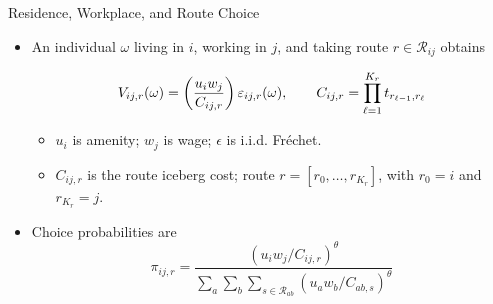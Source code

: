 \documentclass[11pt,aspectratio=169]{beamer}
\newcommand{\R}{\mathcal{R}}
\begin{document}
\begin{frame}{Residence, Workplace, and Route Choice}
\begin{itemize}\small
  \item An individual $\omega$ living in $i$, working in $j$, and taking route $r\in\R_{ij}$ obtains
  \vspace{-0.5em}\begin{footnotesize}\begin{equation}
    V_{ij,r}(\omega) = \left( \frac{u_i w_j}{C_{ij,r}} \right)\varepsilon_{ij,r}(\omega),
    \qquad
    C_{ij,r} = \prod_{\ell=1}^{K_r} t_{r_{\ell-1},r_\ell}
  \vspace{-1.25em}\end{equation}\end{footnotesize}
  \begin{itemize}
    \item $u_i$ is amenity; $w_j$ is wage; $\epsilon$ is i.i.d. Fr\'echet.
    \item $C_{ij,r}$ is the route iceberg cost; route $r=[r_0,\dots,r_{K_r}]$, with $r_0=i$ and $r_{K_r}=j$.
  \end{itemize}
  \vspace{0.25em}
  \item Choice probabilities are
  \vspace{-0.5em}\begin{equation}\label{eq:pi}
    \pi_{ij,r} = \frac{\left(u_i w_j/C_{ij,r}\right)^\theta}{\sum_{a}\sum_b\sum_{s\in\R_{ab}}\left(u_a w_b/C_{ab,s}\right)^\theta}
  \end{equation}
\end{itemize}
\end{frame}
\end{document}
